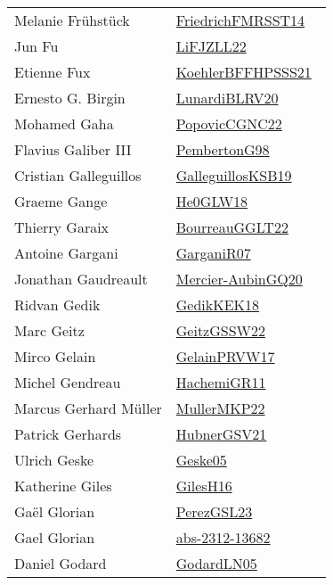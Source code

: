 {\begin{longtable}{p{4cm}p{20cm}}
Melanie Fr{\"{u}}hst{\"{u}}ck & \href{}{FriedrichFMRSST14}~\cite{FriedrichFMRSST14}\\
Jun Fu & \href{works/LiFJZLL22.pdf}{LiFJZLL22}~\cite{LiFJZLL22}\\
Etienne Fux & \href{works/KoehlerBFFHPSSS21.pdf}{KoehlerBFFHPSSS21}~\cite{KoehlerBFFHPSSS21}\\
Ernesto G. Birgin & \href{works/LunardiBLRV20.pdf}{LunardiBLRV20}~\cite{LunardiBLRV20}\\
Mohamed Gaha & \href{works/PopovicCGNC22.pdf}{PopovicCGNC22}~\cite{PopovicCGNC22}\\
Flavius Galiber III & \href{works/PembertonG98.pdf}{PembertonG98}~\cite{PembertonG98}\\
Cristian Galleguillos & \href{works/GalleguillosKSB19.pdf}{GalleguillosKSB19}~\cite{GalleguillosKSB19}\\
Graeme Gange & \href{works/He0GLW18.pdf}{He0GLW18}~\cite{He0GLW18}\\
Thierry Garaix & \href{works/BourreauGGLT22.pdf}{BourreauGGLT22}~\cite{BourreauGGLT22}\\
Antoine Gargani & \href{works/GarganiR07.pdf}{GarganiR07}~\cite{GarganiR07}\\
Jonathan Gaudreault & \href{works/Mercier-AubinGQ20.pdf}{Mercier-AubinGQ20}~\cite{Mercier-AubinGQ20}\\
Ridvan Gedik & \href{works/GedikKEK18.pdf}{GedikKEK18}~\cite{GedikKEK18}\\
Marc Geitz & \href{works/GeitzGSSW22.pdf}{GeitzGSSW22}~\cite{GeitzGSSW22}\\
Mirco Gelain & \href{works/GelainPRVW17.pdf}{GelainPRVW17}~\cite{GelainPRVW17}\\
Michel Gendreau & \href{works/HachemiGR11.pdf}{HachemiGR11}~\cite{HachemiGR11}\\
Marcus Gerhard M{\"{u}}ller & \href{works/MullerMKP22.pdf}{MullerMKP22}~\cite{MullerMKP22}\\
Patrick Gerhards & \href{works/HubnerGSV21.pdf}{HubnerGSV21}~\cite{HubnerGSV21}\\
Ulrich Geske & \href{works/Geske05.pdf}{Geske05}~\cite{Geske05}\\
Katherine Giles & \href{works/GilesH16.pdf}{GilesH16}~\cite{GilesH16}\\
Ga{\"{e}}l Glorian & \href{works/PerezGSL23.pdf}{PerezGSL23}~\cite{PerezGSL23}\\
Gael Glorian & \href{works/abs-2312-13682.pdf}{abs-2312-13682}~\cite{abs-2312-13682}\\
Daniel Godard & \href{works/GodardLN05.pdf}{GodardLN05}~\cite{GodardLN05}\\

\end{longtable}}
